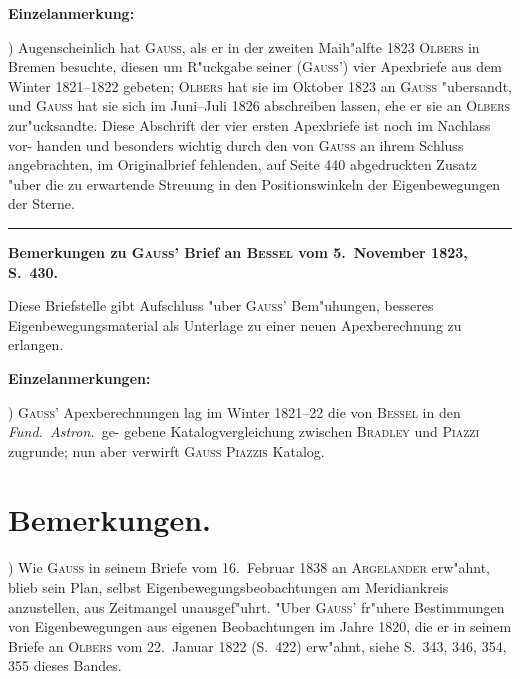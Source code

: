 \documentclass[12pt,a4paper]{article}
\theoremstyle{plain}
\theoremstyle{definition}
\theoremstyle{remark}
\begin{document}
\begin{center}\textbf{Einzelanmerkung:}\end{center}

\smallskip{}) Augenscheinlich hat \textsc{Gauss}, als er in der zweiten Maih"alfte 1823 \textsc{Olbers} in Bremen besuchte,
diesen um R"uckgabe seiner (\textsc{Gauss}') vier Apexbriefe aus dem Winter 1821--1822 gebeten; \textsc{Olbers} hat sie
im Oktober 1823 an \textsc{Gauss} "ubersandt, und \textsc{Gauss} hat sie sich im Juni--Juli 1826 abschreiben lassen, ehe
er sie an \textsc{Olbers} zur"ucksandte. Diese Abschrift der vier ersten Apexbriefe ist noch im Nachlass vor-
handen und besonders wichtig durch den von \textsc{Gauss} an ihrem Schluss angebrachten, im Originalbrief
fehlenden, auf Seite 440 abgedruckten Zusatz "uber die zu erwartende Streuung in den Positionswinkeln
der Eigenbewegungen der Sterne.

\vspace{0.5em}
\hrule
\vspace{0.5em}

\textbf{Bemerkungen zu \textsc{Gauss}' Brief an \textsc{Bessel} vom 5.~November 1823, S.~430.}

Diese Briefstelle gibt Aufschluss "uber \textsc{Gauss}' Bem"uhungen, besseres Eigenbewegungsmaterial als
Unterlage zu einer neuen Apexberechnung zu erlangen.

\begin{center}\textbf{Einzelanmerkungen:}\end{center}

\smallskip{}) \textsc{Gauss}' Apexberechnungen lag im Winter 1821--22 die von \textsc{Bessel} in den \textit{Fund.\ Astron.}\ ge-
gebene Katalogvergleichung zwischen \textsc{Bradley} und \textsc{Piazzi} zugrunde; nun aber verwirft \textsc{Gauss} \textsc{Piazzis}
Katalog.

\newpage
\section*{Bemerkungen.}

\smallskip{}) Wie \textsc{Gauss} in seinem Briefe vom 16.~Februar 1838 an \textsc{Argelander} erw"ahnt, blieb sein Plan,
selbst Eigenbewegungsbeobachtungen am Meridiankreis anzustellen, aus Zeitmangel unausgef"uhrt. "Uber
\textsc{Gauss}' fr"uhere Bestimmungen von Eigenbewegungen aus eigenen Beobachtungen im Jahre 1820, die er in
seinem Briefe an \textsc{Olbers} vom 22.~Januar 1822 (S.~422) erw"ahnt, siehe S.~343, 346, 354, 355 dieses Bandes.
\end{document}
